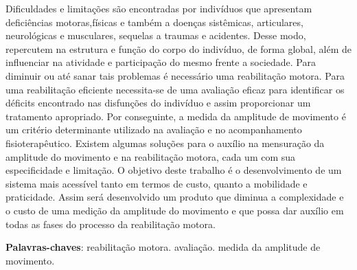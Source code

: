 \begin{resumo}

Dificuldades e limitações são encontradas por indivíduos que apresentam deficiências
 motoras,físicas e também a doenças sistêmicas, articulares, neurológicas e musculares,
 sequelas a traumas e acidentes. Desse modo, repercutem na estrutura e função do corpo
 do indivíduo, de forma global, além de influenciar na atividade e participação do
 mesmo frente a sociedade. Para diminuir ou até sanar tais problemas é necessário uma
 reabilitação motora. Para uma reabilitação eficiente necessita-se de uma avaliação
 eficaz para identificar os déficits encontrado nas disfunções do indivíduo e assim
proporcionar um tratamento apropriado. Por conseguinte, a medida da amplitude de
 movimento é um critério determinante utilizado na avaliação e no acompanhamento
 fisioterapêutico. Existem algumas soluções para o auxílio na mensuração da amplitude
 do movimento e na reabilitação motora, cada um com sua especificidade e limitação.
O objetivo deste trabalho é o desenvolvimento de um sistema mais acessível tanto em termos de custo,
 quanto a mobilidade e praticidade. Assim será desenvolvido um produto que diminua a
complexidade e o custo de uma medição da amplitude do movimento e que possa
 dar auxílio em todas as fases do processo da reabilitação motora.
 \vspace{\onelineskip}

 \noindent
 \textbf{Palavras-chaves}: reabilitação motora. avaliação. medida da amplitude de movimento.
\end{resumo}
